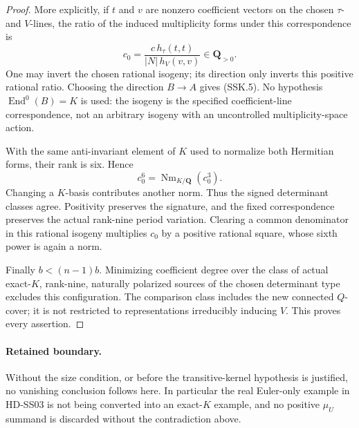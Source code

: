 \begin{proof}
More explicitly, if \(t\) and \(v\) are nonzero coefficient vectors
on the chosen \(\tau\)- and \(V\)-lines, the ratio of the induced
multiplicity forms under this correspondence is
\[
             c_0=\frac{c\,h_\tau(t,t)}
                           {|N|\,h_V(v,v)}\in\mathbf Q_{>0}.
 \tag{SSK.12}
\]
One may invert the chosen rational isogeny; its direction only
inverts this positive rational ratio. Choosing the direction
\(B\longrightarrow A\) gives (SSK.5).
No hypothesis \(\operatorname{End}^0(B)=K\) is used: the isogeny
is the specified coefficient-line correspondence, not an arbitrary
isogeny with an uncontrolled multiplicity-space action.

With the same anti-invariant element of \(K\) used to normalize
both Hermitian forms, their rank is six. Hence
\[
                 c_0^6=\operatorname{Nm}_{K/\mathbf Q}(c_0^3).
 \tag{SSK.13}
\]
Changing a \(K\)-basis contributes another norm. Thus the signed
determinant classes agree. Positivity preserves the signature,
and the fixed correspondence preserves the actual rank-nine period
variation. Clearing a common denominator in this rational isogeny
multiplies \(c_0\) by a positive rational square, whose sixth power
is again a norm.

Finally \(b<(n-1)b\). Minimizing coefficient degree over the class
of actual exact-\(K\), rank-nine, naturally polarized sources of
the chosen determinant type excludes this configuration. The
comparison class includes the new connected \(Q\)-cover; it is
not restricted to representations irreducibly inducing \(V\).
This proves every assertion.
\end{proof}

\paragraph{Retained boundary.}
Without the size condition, or before the transitive-kernel
hypothesis is justified, no vanishing conclusion follows here.
In particular the real Euler-only example in HD-SS03 is not
being converted into an exact-\(K\) example, and no positive
\(\mu_U\) summand is discarded without the contradiction above.
